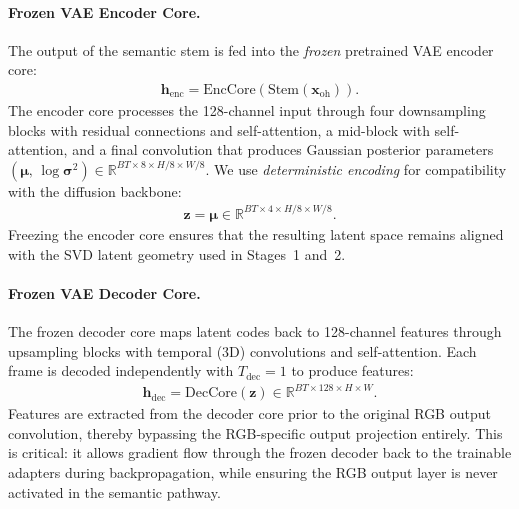 \paragraph{Frozen VAE Encoder Core.}
The output of the semantic stem is fed into the \emph{frozen} pretrained VAE encoder core:
\begin{align}
    \mathbf{h}_{\text{enc}} = \text{EncCore}\!\left(\text{Stem}(\mathbf{x}_{\text{oh}})\right).
    \label{eq:enc_core}
\end{align}
The encoder core processes the 128-channel input through four downsampling blocks with residual connections and self-attention, a mid-block with self-attention, and a final convolution that produces Gaussian posterior parameters $(\boldsymbol{\mu},\, \log \boldsymbol{\sigma}^2) \in \mathbb{R}^{BT \times 8 \times H/8 \times W/8}$. We use \emph{deterministic encoding} for compatibility with the diffusion backbone:
\begin{align}
    \mathbf{z} = \boldsymbol{\mu} \in \mathbb{R}^{BT \times 4 \times H/8 \times W/8}.
    \label{eq:deterministic_latent}
\end{align}
Freezing the encoder core ensures that the resulting latent space remains aligned with the SVD latent geometry used in Stages~1 and~2.

\paragraph{Frozen VAE Decoder Core.}
The frozen decoder core maps latent codes back to 128-channel features through upsampling blocks with temporal (3D) convolutions and self-attention. Each frame is decoded independently with $T_{\text{dec}} = 1$ to produce features:
\begin{align}
    \mathbf{h}_{\text{dec}} = \text{DecCore}(\mathbf{z}) \in \mathbb{R}^{BT \times 128 \times H \times W}.
    \label{eq:dec_features}
\end{align}
Features are extracted from the decoder core prior to the original RGB output convolution, thereby bypassing the RGB-specific output projection entirely. This is critical: it allows gradient flow through the frozen decoder back to the trainable adapters during backpropagation, while ensuring the RGB output layer is never activated in the semantic pathway.

